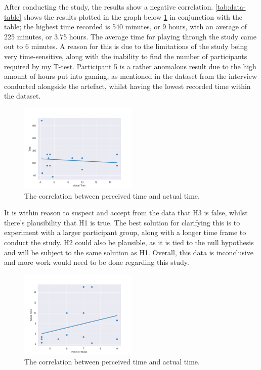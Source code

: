 \documentclass[conference]{IEEEtran}
\begin{document}
After conducting the study, the results show a negative correlation. \ref{tab:data-table} shows the results plotted in the graph below \ref{tab:figure6} in conjunction with the table; the highest time recorded is 540 minutes, or 9 hours, with an average of 225
 minutes, or 3.75 hours. The average time for playing through the study came out to 6 minutes. A reason for this is due to the limitations of the study being very time-sensitive, along with the inability to find the number of participants required by my T-test. Participant 5 is a rather anomalous result due to the high amount of hours put into gaming, as mentioned in the dataset from the interview conducted alongside the artefact, whilst having the lowest recorded time within the dataset.

\begin{figure}[H]
\includegraphics[width = 0.5\textwidth]{Graph1}
\caption{The correlation between perceived time and actual time.}
\label{tab:figure6}
\end{figure}

It is within reason to suspect and accept from the data that H3 is false, whilst there's plausibility that H1 is true. The best solution for clarifying this is to experiment with a larger participant group, along with a longer time frame to conduct the study. H2 could also be plausible, as it is tied to the null hypothesis and will be subject to the same solution as H1. Overall, this data is inconclusive and more work would need to be done regarding this study.\\

\begin{figure}[H]
\includegraphics[width = 0.5\textwidth]{Graph2}
\caption{The correlation between perceived time and actual time.}
\label{tab:figure7}
\end{figure}
\end{document}
